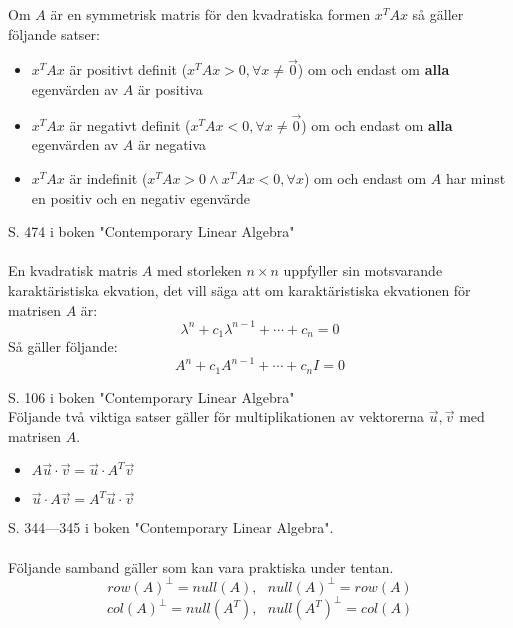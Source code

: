 \documentclass{report}
\begin{document}
{
Om $A$ är en symmetrisk matris för den kvadratiska formen $x^T A x$ så gäller följande satser:
\begin{itemize}
	\item $x^T A x$ är positivt definit ($x^T A x > 0, \forall x \ne \vec{0}$) om och endast om \textbf{alla} egenvärden av $A$ är positiva
	\item $x^T A x$ är negativt definit ($x^T A x < 0, \forall x \ne \vec{0}$) om och endast om \textbf{alla} egenvärden av $A$ är negativa
	\item $x^T A x$ är indefinit ($x^T A x > 0 \land x^T A x < 0, \forall x$) om och endast om $A$ har minst en positiv och en negativ egenvärde
\end{itemize}
}

{
S. 474 i boken "Contemporary Linear Algebra"\\\\

En kvadratisk matris $A$ med storleken $n \times n$ uppfyller sin motsvarande karaktäristiska ekvation, det vill säga att om karaktäristiska ekvationen för matrisen $A$ är:
\[
\lambda^n + c_1 \lambda^{n-1} + \cdots + c_n = 0
\]
Så gäller följande:
\[
A^n + c_1 A^{n-1} + \cdots + c_n I = 0
\]
}

\pagebreak

{
S. 106 i boken "Contemporary Linear Algebra"\\
Följande två viktiga satser gäller för multiplikationen av vektorerna $ \vec{u}, \vec{v} $ med matrisen $A$.
\begin{itemize}
	\item $A \vec{u} \cdot \vec{v} = \vec{u} \cdot A^T \vec{v}$ 
	\item $\vec{u} \cdot A \vec{v} = A^T \vec{u} \cdot \vec{v}$
\end{itemize}
}

{
S. 344---345 i boken "Contemporary Linear Algebra".\\\\

Följande samband gäller som kan vara praktiska under tentan.
\[
row(A)^\perp = null(A), \:\:\: null(A)^\perp = row(A)
\]
\[
col(A)^\perp = null(A^T), \:\:\: null(A^T)^\perp = col(A)
\]
}
\end{document}
